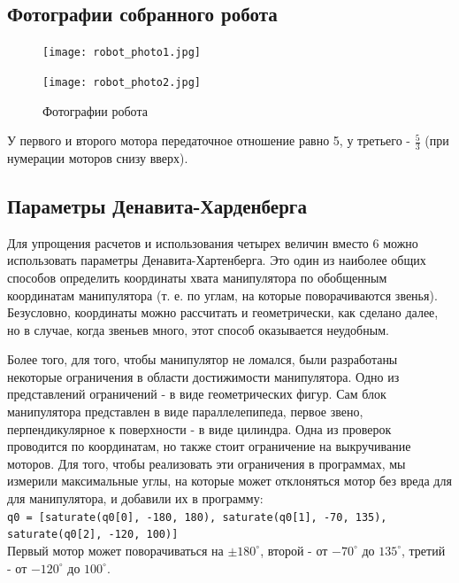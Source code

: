 \documentclass{article}
\begin{document}
\subsection*{Фотографии собранного робота}
\begin{figure}[h!]
    \begin{minipage}{.55\textwidth}
        \centering
        \texttt{[image: robot\_photo1.jpg]}
    \end{minipage}
    \begin{minipage}{.55\textwidth}
        \centering
        \texttt{[image: robot\_photo2.jpg]}
    \end{minipage}
    \caption{Фотографии робота}
\end{figure}
\FloatBarrier
\par У первого и второго мотора передаточное отношение равно 5, у третьего - $\frac{5}{3}$ (при нумерации моторов снизу вверх).
\subsection*{Параметры Денавита-Харденберга}
\par Для упрощения расчетов и использования четырех величин вместо 6 можно использовать параметры Денавита-Хартенберга. Это один из наиболее общих способов определить координаты хвата манипулятора по обобщенным координатам манипулятора (т. е. по углам, на которые поворачиваются звенья). Безусловно, координаты можно рассчитать и геометрически, как сделано далее, но в случае, когда звеньев много, этот способ оказывается неудобным. \par Более того, для того, чтобы манипулятор не ломался, были разработаны некоторые ограничения в области достижимости манипулятора. Одно из представлений ограничений - в виде геометрических фигур. Сам блок манипулятора представлен в виде параллелепипеда, первое звено, перпендикулярное к поверхности - в виде цилиндра. Одна из проверок проводится по координатам, но также стоит ограничение на выкручивание моторов. Для того, чтобы реализовать эти ограничения в программах, мы измерили максимальные углы, на которые может отклоняться мотор без вреда для для манипулятора, и добавили их в программу:
\\
\texttt{q0 = [saturate(q0[0], -180, 180), saturate(q0[1], -70, 135), saturate(q0[2], -120, 100)]}
\\Первый мотор может поворачиваться на $\pm180^\circ$, второй - от $-70^\circ$ до $135^\circ$, третий - от $-120^\circ$ до $100^\circ$.
\end{document}
